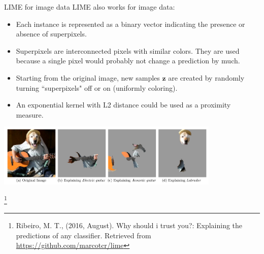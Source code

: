 \documentclass[11pt,compress,t,notes=noshow, xcolor=table]{beamer}
\newcommand{\zv}{\mathbf{z}}
\begin{document}
	\begin{vbframe}{LIME for image data}
	LIME also works for image data:  
	\begin{itemize}
		\item Each instance is represented as a binary vector indicating the presence or absence of superpixels. 
		\item Superpixels are interconnected pixels with similar colors. They are used because a single pixel would probably not change a prediction by much.
		\item Starting from the original image, new samples $\zv$ are created by randomly turning ``superpixels" off or on (uniformly coloring). 
		\item An exponential kernel with L2 distance could be used as a proximity measure.
	\end{itemize}
	\vspace{-0.3cm}
	\begin{center}
		\includegraphics[width=0.8\textwidth]{figure/lime-images}
	\end{center}
	\vspace{-0.3cm}
	\footnote[frame]{Ribeiro, M. T., (2016, August). Why should i trust you?: Explaining the predictions of any classifier. Retrieved from \url{https://github.com/marcotcr/lime}}
\end{vbframe}
\end{document}
